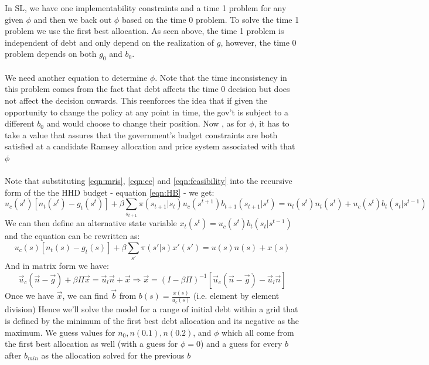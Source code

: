 \documentclass{article} %
\begin{document}
In SL, we have one implementability constraints and a time 1 problem for any given $\phi$ and then we back out $\phi$ based on the time 0 problem. To solve the time 1 problem we use the first best allocation. As seen above, the time 1 problem is independent of debt and only depend on the realization of $g$, however, the time 0 problem depends on both $g_0$ and $b_0$.
\\
\\
We need another equation to determine $\phi$. Note that the time inconsistency in this problem comes from the fact that debt affects the time 0 decision but does not affect the decision onwards. This reenforces the idea that if given the opportunity to change the policy at any point in time, the gov't is subject to a different $b_0$ and would choose to change their position. Now , as for $\phi$, it has to take a value that assures that the government's budget constraints are both satisfied at a candidate Ramsey allocation and price system associated with that $\phi$ 
\\
\\
Note that substituting  \ref{eqn:mris}, \ref{eqn:ee} and  \ref{eqn:feasibility} into the recursive form of the the HHD budget - equation  \ref{eqn:HB} - we get:
$$u_c(s^t)[n_t(s^t) - g_t(s^t)] + \beta \sum_{s_{t+1}} \pi(s_{t+1}|s_t) u_c(s^{t+1})b_{t+1}(s_{t+1}|s^t)  = 
u_l(s^t)n_t(s^t) + u_c(s^t)b_t(s_t|s^{t-1})$$
We can then define an alternative state variable $x_t(s^t) = u_c(s^t)b_t(s_t|s^{t-1})$ and the equation can be rewritten as:
$$u_c(s)[n_t(s) - g_t(s)] + \beta \sum_{s'} \pi(s'|s) x'(s')  = u(s)n(s) + x(s)$$
And in matrix form we have:
$$ \vec{u}_c(\vec{n} - \vec{g}) + \beta \Pi \vec{x} = \vec{u}_l \vec{n} + \vec{x} \Rightarrow 
\vec{x} = (I - \beta \Pi)^{-1}[\vec{u}_c(\vec{n} - \vec{g}) - \vec{u}_l \vec{n}] $$
Once we have $\vec{x}$, we can find $\vec{b}$ from $b(s) = \frac{x(s)}{u_c(s)}$ (i.e. element by element division)
Hence we'll solve the model for a range of initial debt within a grid that is defined by the minimum of the first best debt allocation and its negative as the maximum. We guess values for $n_0,n(0.1),n(0.2)$, and $\phi$ which all come from the first best allocation as well (with a guess for $\phi = 0$) and a guess for every $b$ after $b_{min}$ as the allocation solved for the previous $b$
\end{document}

